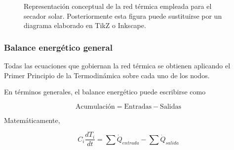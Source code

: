 \begin{figure}[h!]
\centering


\caption{Representación conceptual de la red térmica empleada para el secador solar. Posteriormente esta figura puede sustituirse por un diagrama elaborado en TikZ o Inkscape.}

\label{fig:redtermica}

\end{figure}

\subsubsection{Balance energético general}

Todas las ecuaciones que gobiernan la red térmica se obtienen aplicando el Primer Principio de la Termodinámica sobre cada uno de los nodos.

En términos generales, el balance energético puede escribirse como

\begin{equation}
\boxed{
\text{Acumulación}
=
\text{Entradas}
-
\text{Salidas}
}
\end{equation}

Matemáticamente,

\begin{equation}
\boxed{
C_i
\frac{dT_i}{dt}
=
\sum \dot Q_{entrada}
-
\sum \dot Q_{salida}
}
\label{eq:generalbalance}
\end{equation}

